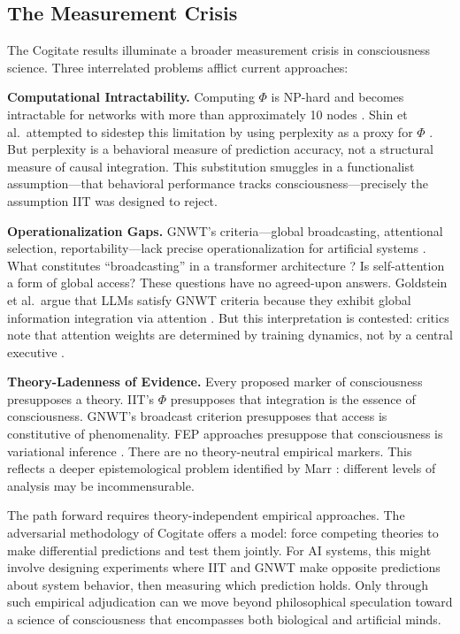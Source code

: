 \subsection{The Measurement Crisis}

The Cogitate results illuminate a broader measurement crisis in consciousness science. Three
interrelated problems afflict current approaches:

\textbf{Computational Intractability.} Computing $\Phi$ is NP-hard and becomes intractable
for networks with more than approximately 10 nodes \cite{albantakis2023iit4}. Shin et al.\
attempted to sidestep this limitation by using perplexity as a proxy for $\Phi$
\cite{shin2025iit}. But perplexity is a behavioral measure of prediction accuracy, not a
structural measure of causal integration. This substitution smuggles in a functionalist
assumption---that behavioral performance tracks consciousness---precisely the assumption IIT
was designed to reject.

\textbf{Operationalization Gaps.} GNWT's criteria---global broadcasting, attentional
selection, reportability---lack precise operationalization for artificial systems
\cite{dehaene2014toward}. What constitutes ``broadcasting'' in a transformer architecture
\cite{vaswani2017attention}? Is self-attention a form of global access? These questions have
no agreed-upon answers. Goldstein et al.\ argue that LLMs satisfy GNWT criteria because they
exhibit global information integration via attention \cite{goldstein2024case}. But this
interpretation is contested: critics note that attention weights are determined by training
dynamics, not by a central executive \cite{butlin2023consciousness}.

\textbf{Theory-Ladenness of Evidence.} Every proposed marker of consciousness presupposes
a theory. IIT's $\Phi$ presupposes that integration is the essence of consciousness. GNWT's
broadcast criterion presupposes that access is constitutive of phenomenality. FEP approaches
presuppose that consciousness is variational inference \cite{friston2010free, wiese2024fep}.
There are no theory-neutral empirical markers. This reflects a deeper epistemological
problem identified by Marr \cite{marr1982vision}: different levels of analysis may be
incommensurable.

The path forward requires theory-independent empirical approaches. The adversarial
methodology of Cogitate offers a model: force competing theories to make differential
predictions and test them jointly. For AI systems, this might involve designing experiments
where IIT and GNWT make opposite predictions about system behavior, then measuring which
prediction holds. Only through such empirical adjudication can we move beyond philosophical
speculation toward a science of consciousness that encompasses both biological and artificial
minds.
